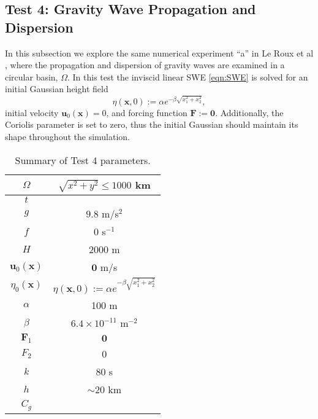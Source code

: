 \subsection{Test 4: Gravity Wave Propagation and Dispersion} \label{sse:GravityWaves}
  In this subsection we explore the same numerical experiment ``a'' in Le Roux
  et al \cite{Le-Roux1998}, where the propagation and dispersion of gravity
  waves are examined in a circular basin, $\Omega$. In this test the inviscid
  linear SWE \eqref{eqn:SWE} is solved for an initial Gaussian height field
  \begin{equation}
    \eta(\mathbf{x},0) := \alpha e^{-\beta \sqrt{x_1^2 + x_2^2}},
    \label{eqn:Guass}
  \end{equation}
  initial velocity $\mathbf{u}_0(\mathbf{x})=0$, and forcing function
  $\mathbf{F}:=\mathbf{0}$. Additionally, the Coriolis parameter is set to zero,
  thus the initial Gaussian should maintain its shape throughout the simulation.

  \def\arraystretch{1.25} %
  \begin{table}[H]
    \begin{center}
      \begin{tabular}{|c|c|}
        \hline
        $\Omega$ & $\sqrt{x^2 + y^2} \le 1000$ km \\ \hline
        $t$ &  \\ \hline
        $g$ & $9.8$ m/s$^2$ \\ \hline 
        $f$ & 0 s$^{-1}$ \\ \hline
        $H$ & 2000 m \\ \hline
        $\mathbf{u}_0(\mathbf{x})$ & $\mathbf{0}$ m/s \\ \hline
        $\eta_0(\mathbf{x})$ & $\eta(\mathbf{x},0) := \alpha e^{-\beta
          \sqrt{x_1^2 + x_2^2}}$ \\ \hline
        $\alpha$ & 100 m \\ \hline
        $\beta$ & $6.4\times10^{-11}$ m$^{-2}$ \\ \hline
        $\mathbf{F}_1$ & $\mathbf{0}$ \\ \hline
        $F_2$ & 0 \\ \hline
        $k$ & 80 s \\ \hline
        $h$ & $\sim 20$ km \\ \hline
        $C_g$ & \\ \hline
      \end{tabular}
      \caption{Summary of Test 4 parameters.}
      \label{tab:GravityWaveParams}
    \end{center}
  \end{table}
